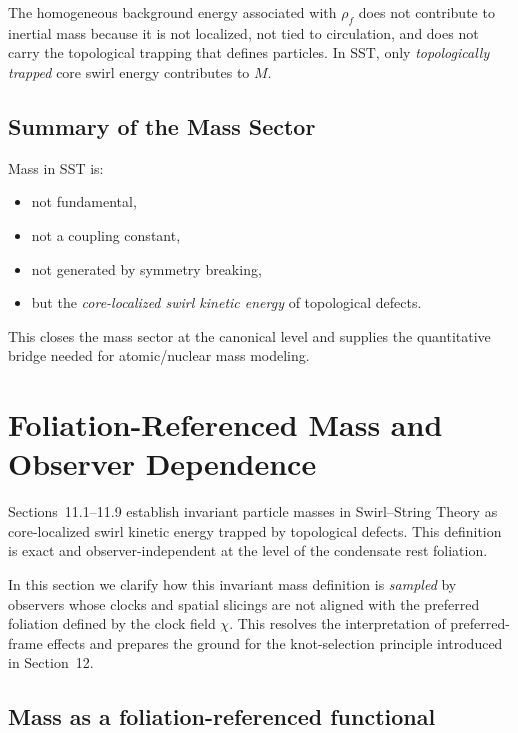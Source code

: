 \documentclass[10pt]{article}
\newcommand{\rhof}{\rho_{\!f}}                           %
\begin{document}
        The homogeneous background energy associated with $\rhof$ does not contribute to
        inertial mass because it is not localized, not tied to circulation, and does not
        carry the topological trapping that defines particles. In SST, only
        \emph{topologically trapped} core swirl energy contributes to $M$.

    \subsection{Summary of the Mass Sector}

        Mass in SST is:
        \begin{itemize}
            \item not fundamental,
            \item not a coupling constant,
            \item not generated by symmetry breaking,
            \item but the \emph{core-localized swirl kinetic energy} of topological defects.
        \end{itemize}

        This closes the mass sector at the canonical level and supplies the quantitative
        bridge needed for atomic/nuclear mass modeling.

    \section{Foliation-Referenced Mass and Observer Dependence}
    \label{sec:foliation_mass}

    Sections~11.1--11.9 establish invariant particle masses in Swirl--String Theory
    as core-localized swirl kinetic energy trapped by topological defects.
    This definition is exact and observer-independent at the level of the
    condensate rest foliation.

    In this section we clarify how this invariant mass definition is
    \emph{sampled} by observers whose clocks and spatial slicings are
    not aligned with the preferred foliation defined by the clock field $\chi$.
    This resolves the interpretation of preferred-frame effects and
    prepares the ground for the knot-selection principle introduced in
    Section~12.

    \subsection{Mass as a foliation-referenced functional}
\end{document}
